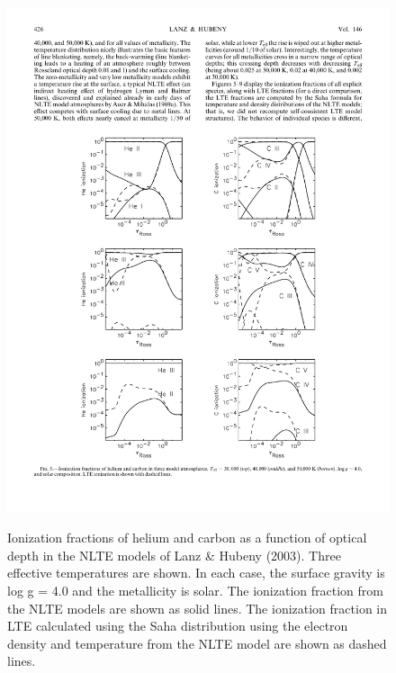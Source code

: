 \begin{figure}
\includegraphics[width=\linewidth]{figures/lanz-hubeny-ionization.pdf}
\label{figure:lanz-hubeny-ionization}
\caption{Ionization fractions of helium and carbon as a function of optical depth in the NLTE models of Lanz \& Hubeny (2003). Three effective temperatures are shown. In each case, the surface gravity is log g = 4.0 and the metallicity is solar. The ionization fraction from the NLTE models are shown as solid lines. The ionization fraction in LTE calculated using the Saha distribution using the electron density and temperature from the NLTE model are shown as dashed lines.}
\end{figure}

